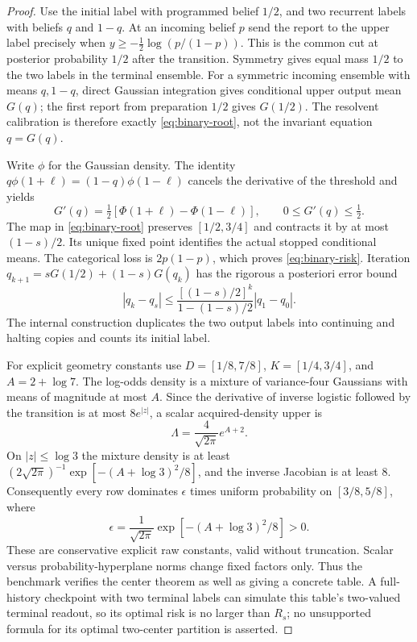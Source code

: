 \begin{proof}
Use the initial label with programmed belief $1/2$, and two recurrent labels with beliefs $q$ and $1-q$. At an incoming belief $p$ send the report to the upper label precisely when $y\ge-\tfrac12\log(p/(1-p))$. This is the common cut at posterior probability $1/2$ after the transition. Symmetry gives equal mass $1/2$ to the two labels in the terminal ensemble. For a symmetric incoming ensemble with means $q,1-q$, direct Gaussian integration gives conditional upper output mean $G(q)$; the first report from preparation $1/2$ gives $G(1/2)$. The resolvent calibration is therefore exactly \eqref{eq:binary-root}, not the invariant equation $q=G(q)$.

Write $\phi$ for the Gaussian density. The identity $q\phi(1+\ell)=(1-q)\phi(1-\ell)$ cancels the derivative of the threshold and yields
\[
 G'(q)=\tfrac12[\Phi(1+\ell)-\Phi(1-\ell)],\qquad
 0\le G'(q)\le\tfrac12.
\]
The map in \eqref{eq:binary-root} preserves $[1/2,3/4]$ and contracts it by at most $(1-s)/2$. Its unique fixed point identifies the actual stopped conditional means. The categorical loss is $2p(1-p)$, which proves \eqref{eq:binary-risk}. Iteration $q_{k+1}=sG(1/2)+(1-s)G(q_k)$ has the rigorous a posteriori error bound
\[
 |q_k-q_s|\le\frac{[(1-s)/2]^k}{1-(1-s)/2}|q_1-q_0|.
\]
The internal construction duplicates the two output labels into continuing and halting copies and counts its initial label.

For explicit geometry constants use $D=[1/8,7/8]$, $K=[1/4,3/4]$, and $A=2+\log7$. The log-odds density is a mixture of variance-four Gaussians with means of magnitude at most $A$. Since the derivative of inverse logistic followed by the transition is at most $8e^{|z|}$, a scalar acquired-density upper is
\[
 \Lambda=\frac{4}{\sqrt{2\pi}}e^{A+2}.
\]
On $|z|\le\log3$ the mixture density is at least $(2\sqrt{2\pi})^{-1}\exp[-(A+\log3)^2/8]$, and the inverse Jacobian is at least $8$. Consequently every row dominates $\epsilon$ times uniform probability on $[3/8,5/8]$, where
\[
 \epsilon=\frac1{\sqrt{2\pi}}\exp[-(A+\log3)^2/8]>0.
\]
These are conservative explicit raw constants, valid without truncation. Scalar versus probability-hyperplane norms change fixed factors only. Thus the benchmark verifies the center theorem as well as giving a concrete table. A full-history checkpoint with two terminal labels can simulate this table's two-valued terminal readout, so its optimal risk is no larger than $R_s$; no unsupported formula for its optimal two-center partition is asserted.
\end{proof}
